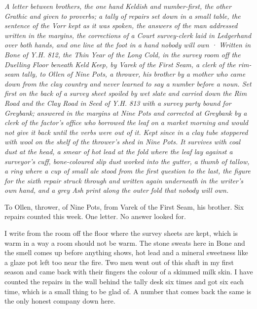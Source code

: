 \documentclass{design/chronicle}
\begin{document}
\clearpage{}
{\centering\FellFont\itshape\footnotesize\color{faded} A letter between brothers, the one hand Keldish and number-first, the other Grathic and given to proverbs; a tally of repairs set down in a small table, the sentence of the Vorr kept as it was spoken, the answers of the man addressed written in the margins, the corrections of a Court survey-clerk laid in Ledgerhand over both hands, and one line at the foot in a hand nobody will own · Written in Bone of Y.H. 812, the Thin Year of the Long Cold, in the survey room off the Duelling Floor beneath Keld Keep, by Varek of the First Seam, a clerk of the rim-seam tally, to Ollen of Nine Pots, a thrower, his brother by a mother who came down from the clay country and never learned to say a number before a noun. Set first on the back of a survey sheet spoiled by wet slate and carried down the Rim Road and the Clay Road in Seed of Y.H. 813 with a survey party bound for Greybank; answered in the margins at Nine Pots and corrected at Greybank by a clerk of the factor’s office who borrowed the leaf on a market morning and would not give it back until the verbs were out of it. Kept since in a clay tube stoppered with wool on the shelf of the thrower’s shed in Nine Pots. It survives with coal dust at the head, a smear of hot lead at the fold where the leaf lay against a surveyor’s cuff, bone-coloured slip dust worked into the gutter, a thumb of tallow, a ring where a cup of small ale stood from the first question to the last, the figure for the sixth repair struck through and written again underneath in the writer’s own hand, and a grey Ash print along the outer fold that nobody will own.\par}\medskip
To Ollen, thrower, of Nine Pots, from Varek of the First Seam, his brother. Six repairs counted this week. One letter. No answer looked for.

I write from the room off the floor where the survey sheets are kept, which is warm in a way a room should not be warm. The stone sweats here in Bone and the smell comes up before anything shows, hot lead and a mineral sweetness like a glaze pot left too near the fire. Two men went out of this shaft in my first season and came back with their fingers the colour of a skimmed milk skin. I have counted the repairs in the wall behind the tally desk six times and got six each time, which is a small thing to be glad of. A number that comes back the same is the only honest company down here.
\end{document}
